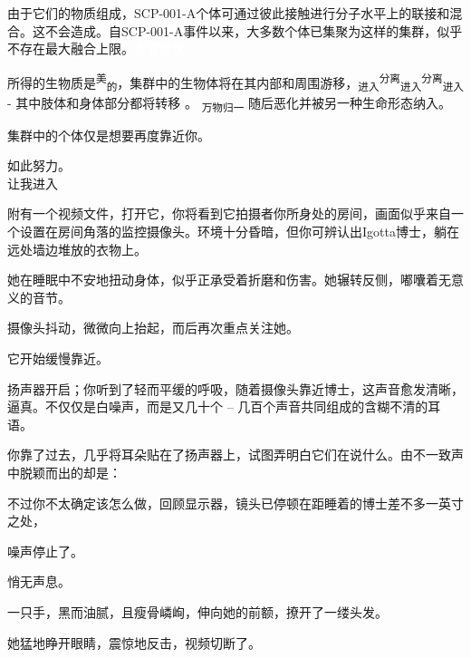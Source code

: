
由于它们的物质组成，SCP-001-A个体可通过彼此接触进行分子水平上的联接和混合。这不会造成。自SCP-001-A事件以来，大多数个体已集聚为这样的集群，似乎不存在最大融合上限。\textcolor{white}{不要担忧}

所得的生物质是\textsuperscript{美}\textsubscript{的}，集群中的生物体将在其内部和周围游移，\textsubscript{进入}\textsuperscript{分离}\textsubscript{进入}\textsuperscript{分离}\textsubscript{进入} - 其中肢体和身体部分都将转移 。 \textsubscript{万物归一} 随后恶化并被另一种生命形态纳入。

集群中的个体仅是想要再度靠近你。

如此努力。\\
\small{让我进入}


\begin{scpbox}

附有一个视频文件，打开它，你将看到它拍摄者你所身处的房间，画面似乎来自一个设置在房间角落的监控摄像头。环境十分昏暗，但你可辨认出Igotta博士，躺在远处墙边堆放的衣物上。

她在睡眠中不安地扭动身体，似乎正承受着折磨和伤害。她辗转反侧，嘟囔着无意义的音节。

摄像头抖动，微微向上抬起，而后再次重点关注她。

它开始缓慢靠近。

扬声器开启；你听到了轻而平缓的呼吸，随着摄像头靠近博士，这声音愈发清晰，逼真。不仅仅是白噪声，而是又几十个 – 几百个声音共同组成的含糊不清的耳语。

你靠了过去，几乎将耳朵贴在了扬声器上，试图弄明白它们在说什么。由不一致声中脱颖而出的却是：

\end{scpbox}


\begin{scpbox}

不过你不太确定该怎么做，回顾显示器，镜头已停顿在距睡着的博士差不多一英寸之处，

噪声停止了。

悄无声息。

一只手，黑而油腻，且瘦骨嶙峋，伸向她的前额，撩开了一缕头发。

她猛地睁开眼睛，震惊地反击，视频切断了。

\end{scpbox}

